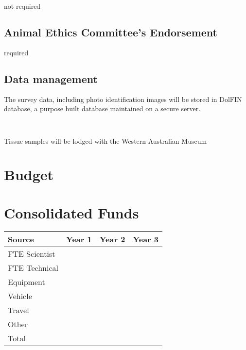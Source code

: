 \documentclass[version=last,
    paper=a4,                               %
    10pt,                                   %
    dvipsnames,
    oneside,                              %
    headings=openany,                       %
    open=any,
    BCOR=7mm,                               %
    DIV=15,     %
]{scrbook}
\begin{document}
not required




\subsection*{Animal Ethics Committee's Endorsement}

required




\subsection*{Data management}

The survey data, including photo identification images will be stored in
DolFIN database, a purpose built database maintained on a secure server.

~

Tissue samples will be lodged with the Western Australian Museum




\section*{Budget}

\section*{Consolidated Funds }



\begin{longtabu} to \linewidth { |  X | X | X | X | }
\hline
{}
Source & Year 1 & Year 2 & Year 3\\
\hline
\endhead



FTE Scientist &  &  & \\



FTE Technical &  &  & \\



Equipment &  &  & \\



Vehicle &  &  & \\



Travel &  &  & \\



Other &  &  & \\



Total &  &  & \\


\hline
\end{longtabu}
\end{document}
